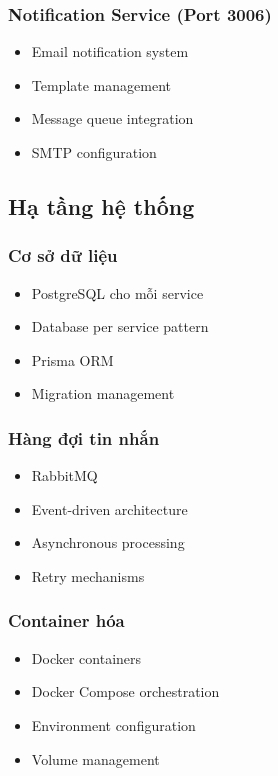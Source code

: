 \documentclass[12pt,a4paper]{report}
\begin{document}
    \subsubsection{Notification Service (Port 3006)}
    \begin{itemize}
        \item Email notification system
        \item Template management
        \item Message queue integration
        \item SMTP configuration
    \end{itemize}

    \subsection{Hạ tầng hệ thống}
    \subsubsection{Cơ sở dữ liệu}
    \begin{itemize}
        \item PostgreSQL cho mỗi service
        \item Database per service pattern
        \item Prisma ORM
        \item Migration management
    \end{itemize}

    \subsubsection{Hàng đợi tin nhắn}
    \begin{itemize}
        \item RabbitMQ
        \item Event-driven architecture
        \item Asynchronous processing
        \item Retry mechanisms
    \end{itemize}

    \subsubsection{Container hóa}
    \begin{itemize}
        \item Docker containers
        \item Docker Compose orchestration
        \item Environment configuration
        \item Volume management
    \end{itemize}
\end{document}
